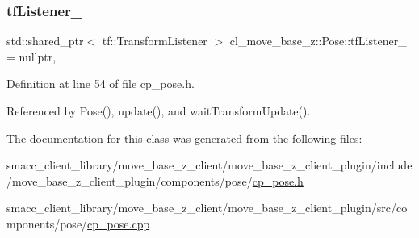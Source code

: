 \mbox{\label{classcl__move__base__z_1_1Pose_a188a5ac62d5424c1eacd667868049962}} 
\subsubsection{\texorpdfstring{tf\+Listener\+\_\+}{tfListener\_}}
{\footnotesize\ttfamily std\+::shared\+\_\+ptr$<$ tf\+::\+Transform\+Listener $>$ cl\+\_\+move\+\_\+base\+\_\+z\+::\+Pose\+::tf\+Listener\+\_\+ = nullptr\hspace{0.3cm}{\ttfamily [static]}, {\ttfamily [private]}}



Definition at line 54 of file cp\+\_\+pose.\+h.



Referenced by Pose(), update(), and wait\+Transform\+Update().



The documentation for this class was generated from the following files\+:\begin{DoxyCompactItemize}
\item 
smacc\+\_\+client\+\_\+library/move\+\_\+base\+\_\+z\+\_\+client/move\+\_\+base\+\_\+z\+\_\+client\+\_\+plugin/include/move\+\_\+base\+\_\+z\+\_\+client\+\_\+plugin/components/pose/\hyperlink{cp__pose_8h}{cp\+\_\+pose.\+h}\item 
smacc\+\_\+client\+\_\+library/move\+\_\+base\+\_\+z\+\_\+client/move\+\_\+base\+\_\+z\+\_\+client\+\_\+plugin/src/components/pose/\hyperlink{cp__pose_8cpp}{cp\+\_\+pose.\+cpp}\end{DoxyCompactItemize}
